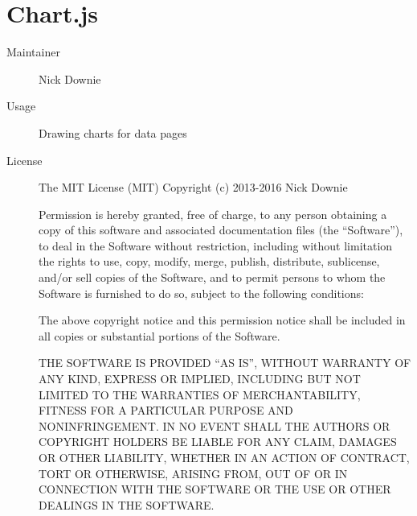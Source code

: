   \section*{Chart.js}
    \begin{description}
      \item[Maintainer] Nick Downie
      \item[Usage] Drawing charts for data pages
      \item[License] \scriptsize The MIT License (MIT) Copyright (c) 2013-2016 Nick Downie

        Permission is hereby granted, free of charge, to any person obtaining a copy of this software and associated documentation files (the ``Software''), to deal in the Software without restriction, including without limitation the rights to use, copy, modify, merge, publish, distribute, sublicense, and/or sell copies of the Software, and to permit persons to whom the Software is furnished to do so, subject to the following conditions:

        The above copyright notice and this permission notice shall be included in all copies or substantial portions of the Software.

        THE SOFTWARE IS PROVIDED ``AS IS'', WITHOUT WARRANTY OF ANY KIND, EXPRESS OR IMPLIED, INCLUDING BUT NOT LIMITED TO THE WARRANTIES OF MERCHANTABILITY, FITNESS FOR A PARTICULAR PURPOSE AND NONINFRINGEMENT. IN NO EVENT SHALL THE AUTHORS OR COPYRIGHT HOLDERS BE LIABLE FOR ANY CLAIM, DAMAGES OR OTHER LIABILITY, WHETHER IN AN ACTION OF CONTRACT, TORT OR OTHERWISE, ARISING FROM, OUT OF OR IN CONNECTION WITH THE SOFTWARE OR THE USE OR OTHER DEALINGS IN THE SOFTWARE.
    \end{description}


